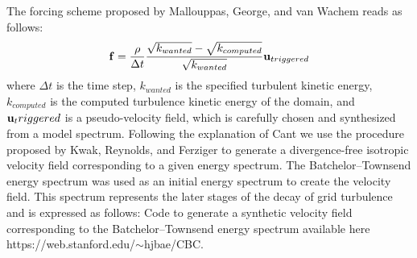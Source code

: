 \documentclass[11pt]{article}
\begin{document}
The forcing scheme proposed by Mallouppas, George, and van Wachem reads as follows:
\begin{equation}
{\bf f} = \frac{\rho}{\Delta t} \frac{\sqrt{k_{wanted}} - \sqrt{k_{computed}} }{\sqrt{k_{wanted}}}{\bf u}_{triggered}
\end{equation}
where $\Delta t$ is the time step, $k_{wanted}$ is the specified turbulent kinetic energy, $k_{computed}$ is the computed turbulence kinetic energy of the domain, and ${\bf u}_triggered$ is a pseudo-velocity field, which is
carefully chosen and synthesized from a model spectrum.
Following the explanation of Cant we use the procedure proposed by Kwak, Reynolds, and Ferziger to generate a divergence-free isotropic velocity field corresponding to a given energy spectrum. 
The Batchelor–Townsend energy spectrum was used as an initial energy spectrum to create the velocity field. 
This spectrum represents the later stages of the decay of grid turbulence and is expressed as follows:
Code to generate a synthetic velocity field corresponding to the Batchelor–Townsend energy spectrum available here https://web.stanford.edu/$\sim$hjbae/CBC.
\end{document}

